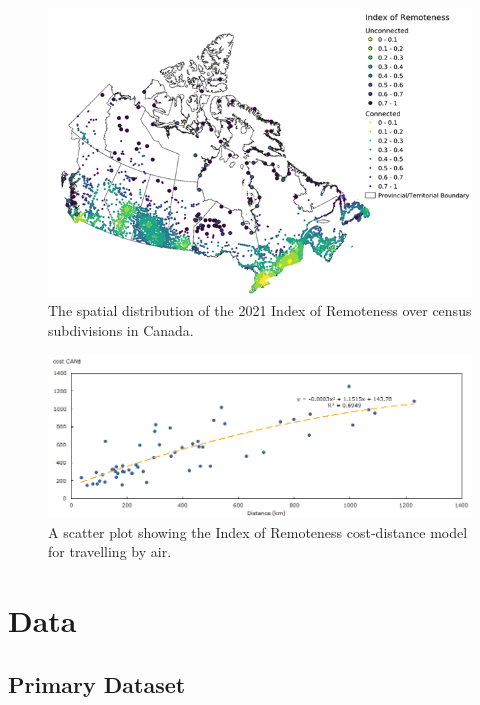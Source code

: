 \documentclass[11pt, a4paper]{article}
\begin{document}
\begin{figure}[H]
\centering
\includegraphics[width=\textwidth]{./IoR/ior_spatial.png}
\caption[IoR Distribution]{The spatial distribution of the 2021 Index of Remoteness over census subdivisions in Canada.}\label{iorspatial}
\end{figure}


\begin{figure}[H]
\centering
\includegraphics[width=\textwidth]{./IoR/air_cost.png}
\caption[IoR Cost-Distance Model]{A scatter plot showing the Index of Remoteness cost-distance model for travelling by air.}\label{aircost}
\end{figure}








\pagebreak
\section{Data}




\subsection{Primary Dataset}
\end{document}
